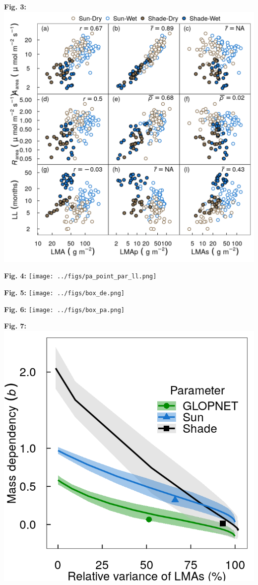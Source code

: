 \documentclass[
  12pt,
  letterpaper,
  DIV=11,
  numbers=noendperiod]{scrartcl}
\begin{document}
\textbf{Fig. 3:} \includegraphics{../figs/pa_point.png} \newpage

\textbf{Fig. 4:} \texttt{[image: ../figs/pa\_point\_par\_ll.png]} \newpage

\textbf{Fig. 5:} \texttt{[image: ../figs/box\_de.png]} \newpage

\textbf{Fig. 6:} \texttt{[image: ../figs/box\_pa.png]} \newpage

\textbf{Fig. 7:} \includegraphics{../figs/mass_prop_mv.png}
\end{document}
